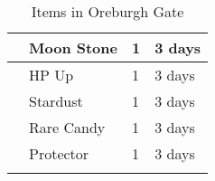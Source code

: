 \begin{longtable}{|| l l l l ||}%
\hline%
&Moon Stone&1&3 days\\%
\hline%
&HP Up&1&3 days\\%
\hline%
&Stardust&1&3 days\\%
\hline%
&Rare Candy&1&3 days\\%
\hline%
&Protector&1&3 days\\%
\hline%
\endhead%
\hline%
\caption{Items in Oreburgh Gate}%
\label{tab:OreburghGateItems}%
\end{longtable}
